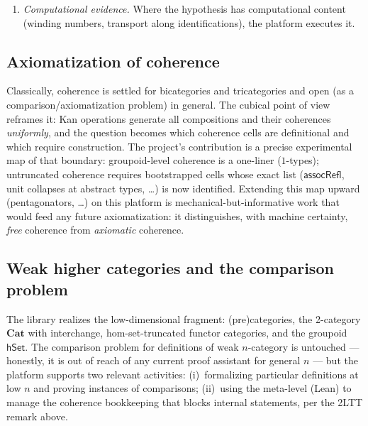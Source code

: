 \documentclass[11pt]{article}
\newcommand{\op}[1]{\ensuremath{\mathsf{#1}}}
\begin{document}
\begin{enumerate}[leftmargin=1.7em]
defined and verified.  This is a concrete, feasible research direction
enabled by the codebase.
This direction is now \emph{begun}: the module `LibTower`
defines, as a Lean function of external $n$, the iterated loop space
$\Omega^n(A,a)$ together with its composition, untruncated associator,
Mac~Lane triangle and pentagon, the middle-four interchange, and (from
dimension 2) the Eckmann--Hilton braiding --- each
rung a one-line instantiation of the generic coherence cells, stated
uniformly in the ambient type and kernel-checked per level (verified for
$n \le 3$; the check is cheap at every level).  Every object-language
type thus demonstrably carries the first rungs of a van den
Berg--Garner-style weak $\omega$-groupoid structure.  The tower is
moreover \emph{functorial}: iterated `cong` gives loop maps
$\Omega^n f$ at every level with no conjugation (basepoints are
preserved definitionally), and the functor law
$\Omega^n(g \circ f) \equiv \Omega^n g \circ \Omega^n f$ holds by
`refl` at every level.
\item \emph{Computational evidence.}  Where the hypothesis has
computational content (winding numbers, transport along
identifications), the platform executes it.
\end{enumerate}

\subsection{Axiomatization of coherence}
Classically, coherence is settled for bicategories and tricategories and
open (as a comparison/axiomatization problem) in general.  The cubical
point of view reframes it: Kan operations generate all compositions and
their coherences \emph{uniformly}, and the question becomes which
coherence cells are definitional and which require construction.  The
project's contribution is a precise experimental map of that boundary:
groupoid-level coherence is a one-liner ($1$-types); untruncated
coherence requires bootstrapped cells whose exact list
($\op{assocRefl}$, unit collapses at abstract types, \dots) is now
identified.  Extending this map upward (pentagonators, \dots) on this
platform is mechanical-but-informative work that would feed any future
axiomatization: it distinguishes, with machine certainty, \emph{free}
coherence from \emph{axiomatic} coherence.

\subsection{Weak higher categories and the comparison problem}
The library realizes the low-dimensional fragment: (pre)categories,
the 2-category $\mathbf{Cat}$ with interchange, hom-set-truncated functor
categories, and the groupoid $\op{hSet}$.  The comparison problem for
definitions of weak $n$-category is untouched --- honestly, it is out of
reach of any current proof assistant for general $n$ --- but the platform
supports two relevant activities: (i)~formalizing particular definitions
at low $n$ and proving instances of comparisons; (ii)~using the
meta-level (Lean) to manage the coherence bookkeeping that blocks
internal statements, per the 2LTT remark above.
\end{document}
